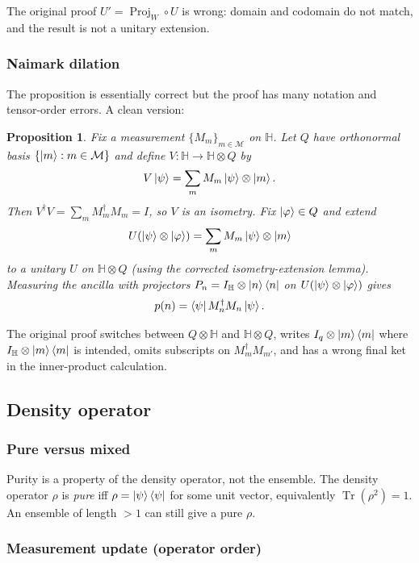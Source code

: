 \documentclass[12pt]{article}
\theoremstyle{plain}
\newtheorem{proposition}[thm]{Proposition}
\theoremstyle{definition}
\begin{document}
The original proof $U'=\operatorname{Proj}_W\circ U$ is wrong: domain and codomain do not match, and the result is not a unitary extension.

\subsubsection*{Naimark dilation}

The proposition is essentially correct but the proof has many notation and tensor-order errors. A clean version:

\begin{proposition}
Fix a measurement $\{M_m\}_{m\in\mathcal{M}}$ on $\mathbb{H}$. Let $Q$ have orthonormal basis $\{\ket{m}:m\in\mathcal{M}\}$ and define $V:\mathbb{H}\to\mathbb{H}\otimes Q$ by
\[
V\ket{\psi}=\sum_m M_m\ket{\psi}\otimes\ket{m}.
\]
Then $V^\dagger V=\sum_m M_m^\dagger M_m=I$, so $V$ is an isometry. Fix $\ket{\varphi}\in Q$ and extend
\[
U(\ket{\psi}\otimes\ket{\varphi})=\sum_m M_m\ket{\psi}\otimes\ket{m}
\]
to a unitary $U$ on $\mathbb{H}\otimes Q$ (using the corrected isometry-extension lemma). Measuring the ancilla with projectors $P_n=I_\mathbb{H}\otimes\ket{n}\bra{n}$ on $U(\ket{\psi}\otimes\ket{\varphi})$ gives
\[
p(n)=\bra{\psi}M_n^\dagger M_n\ket{\psi}.
\]
\end{proposition}

The original proof switches between $Q\otimes\mathbb{H}$ and $\mathbb{H}\otimes Q$, writes $I_q\otimes\ket{m}\bra{m}$ where $I_\mathbb{H}\otimes\ket{m}\bra{m}$ is intended, omits subscripts on $M_m^\dagger M_{m'}$, and has a wrong final ket in the inner-product calculation.

\subsection{Density operator}

\subsubsection*{Pure versus mixed}

Purity is a property of the density operator, not the ensemble. The density operator $\rho$ is \emph{pure} iff $\rho=\ket{\psi}\bra{\psi}$ for some unit vector, equivalently $\operatorname{Tr}(\rho^2)=1$. An ensemble of length $>1$ can still give a pure $\rho$.

\subsubsection*{Measurement update (operator order)}
\end{document}
